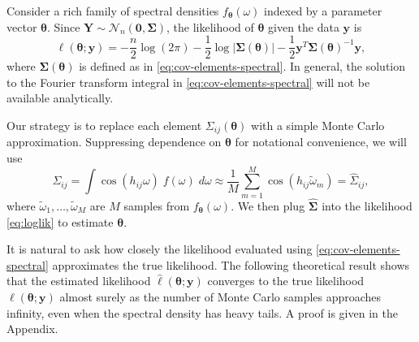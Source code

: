 \documentclass[12pt]{article}
\begin{document}
Consider a rich family of spectral densities $f_{\bm{\theta}}(\omega)$ indexed by a parameter vector $\bm{\theta}$.  Since $\bm{Y} \sim \mathcal{N}_n(\bm{0}, \bm{\Sigma})$, the likelihood of $\bm{\theta}$ given the data $\bm{y}$ is
\begin{equation} \label{eq:loglik}
  \ell(\bm{\theta}; \bm{y}) = -\frac{n}{2} \log(2\pi) - \frac{1}{2} \log |\bm{\Sigma}(\bm{\theta})| - \frac{1}{2} \bm{y}^T \bm{\Sigma}(\bm{\theta})^{-1} \bm{y},
\end{equation}
where $\bm{\Sigma}(\bm{\theta})$ is defined as in \eqref{eq:cov-elements-spectral}.  In general, the solution to the Fourier transform integral in \eqref{eq:cov-elements-spectral} will not be available analytically.

Our strategy is to replace each element $\Sigma_{ij}(\bm{\theta})$ with a simple Monte Carlo approximation.  Suppressing dependence on $\bm{\theta}$ for notational convenience, we will use  
\begin{equation}
  \Sigma_{ij} = \int \cos(h_{ij}\omega) \; f(\omega) \; d\omega \approx  \frac{1}{M} \sum_{m=1}^M \cos(h_{ij}\widetilde{\omega}_m) = \widehat{\Sigma}_{ij},
\end{equation}
where $\widetilde{\omega}_1, \dots, \widetilde{\omega}_M$ are $M$ samples from $f_{\bm{\theta}}(\omega)$. We then plug $\widehat{\bm{\Sigma}}$ into the likelihood \eqref{eq:loglik} to estimate $\bm{\theta}$.


It is natural to ask how closely the likelihood evaluated using \eqref{eq:cov-elements-spectral} approximates the true likelihood.  The following theoretical result shows that the estimated likelihood $\hat{\ell}(\bm{\theta}; \bm{y})$ converges to the true likelihood $\ell(\bm{\theta}; \bm{y})$ almost surely as the number of Monte Carlo samples approaches infinity, even when the spectral density has heavy tails. A proof is given in the Appendix.
\end{document}
